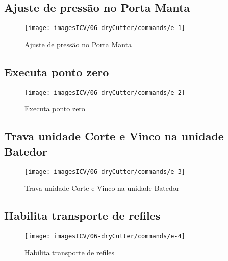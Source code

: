 \usepackage{graphicx}
\newpage
\thispagestyle{fancy}
\vspace{\fill}

\subsection{Ajuste de pressão no Porta Manta}
\begin{figure}
    \centering
    \texttt{[image: imagesICV/06-dryCutter/commands/e-1]}
    \caption{Ajuste de pressão no Porta Manta}
\end{figure}
\newpage
\thispagestyle{fancy}
\vspace{\fill}

\subsection{Executa ponto zero}
\begin{figure}
    \centering
    \texttt{[image: imagesICV/06-dryCutter/commands/e-2]}
    \caption{Executa ponto zero}
\end{figure}
\newpage
\thispagestyle{fancy}
\vspace{\fill}

\subsection{Trava unidade Corte e Vinco na unidade Batedor}
\begin{figure}
    \centering
    \texttt{[image: imagesICV/06-dryCutter/commands/e-3]}
    \caption{Trava unidade Corte e Vinco na unidade Batedor}
\end{figure}
\newpage
\thispagestyle{fancy}
\vspace{\fill}

\subsection{Habilita transporte de refiles}
\begin{figure}
    \centering
    \texttt{[image: imagesICV/06-dryCutter/commands/e-4]}
    \caption{Habilita transporte de refiles}
\end{figure}
\newpage
\thispagestyle{fancy}
\vspace{\fill}